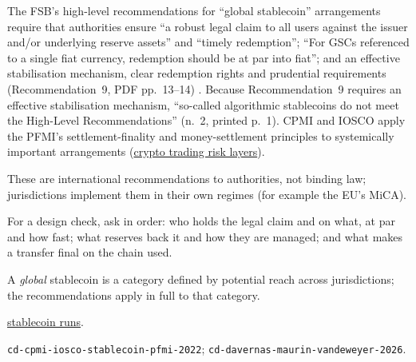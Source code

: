 \begin{qfrule}\label{rule:stablecoin-standards}
 The FSB's high-level recommendations for ``global stablecoin'' arrangements require that authorities ensure ``a robust legal claim to all users against the issuer and/or underlying reserve assets'' and ``timely redemption''; ``For GSCs referenced to a single fiat currency, redemption should be at par into fiat''; and an effective stabilisation mechanism, clear redemption rights and prudential requirements (Recommendation~9, PDF pp.~13--14) \citep[Final Report, 17 July 2023, Recommendation~9, printed pp.~9--10]{cd-fsb-stablecoin-2023}. Because Recommendation~9 requires an effective stabilisation mechanism, ``so-called algorithmic stablecoins do not meet the High-Level Recommendations'' (n.~2, printed p.~1). CPMI and IOSCO apply the PFMI's settlement-finality and money-settlement principles to systemically important arrangements (\hyperref[def:crypto-trading-risk-layers]{crypto trading risk layers}).

 These are international recommendations to authorities, not binding law; jurisdictions implement them in their own regimes (for example the EU's MiCA).

 For a design check, ask in order: who holds the legal claim and on what, at par and how fast; what reserves back it and how they are managed; and what makes a transfer final on the chain used.

 A \emph{global} stablecoin is a category defined by potential reach across jurisdictions; the recommendations apply in full to that category.

 \hyperref[ev:stablecoin-runs]{stablecoin runs}.

 \nolinkurl{cd-cpmi-iosco-stablecoin-pfmi-2022}; \nolinkurl{cd-davernas-maurin-vandeweyer-2026}.

\end{qfrule}
